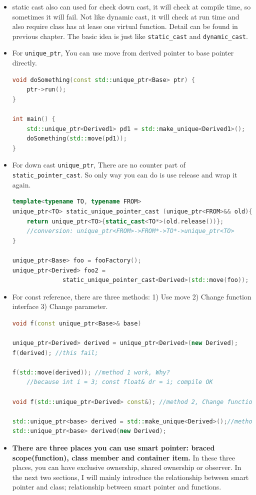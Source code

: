 \documentclass[a4paper,11pt,twoside]{book}
\begin{document}
\begin{itemize}
\item static cast also can used for check down cast, it will check at compile time, so sometimes it will fail. Not like dynamic cast, it will check at run time and also require class has at lease one virtual function. Detail can be found in previous chapter. The basic idea is just like \texttt{static\_cast} and \texttt{dynamic\_cast}.

\item For \texttt{unique\_ptr}, You can use move from derived pointer to base pointer directly.
\begin{lstlisting}[frame=single, language=c++, mathescape=true]
void doSomething(const std::unique_ptr<Base> ptr) {
    ptr->run();
}

int main() {
    std::unique_ptr<Derived1> pd1 = std::make_unique<Derived1>();
    doSomething(std::move(pd1));
}
\end{lstlisting}

\item For down cast \texttt{unique\_ptr}, There are no counter part of \texttt{static\_pointer\_cast}. So only way you can do is use release and wrap it again.

\begin{lstlisting}[frame=single, language=c++, mathescape=true]
template<typename TO, typename FROM>
unique_ptr<TO> static_unique_pointer_cast (unique_ptr<FROM>&& old){
	return unique_ptr<TO>{static_cast<TO*>(old.release())};
	//conversion: unique_ptr<FROM>->FROM*->TO*->unique_ptr<TO>
}

unique_ptr<Base> foo = fooFactory();
unique_ptr<Derived> foo2 = 
              static_unique_pointer_cast<Derived>(std::move(foo));
\end{lstlisting}

\item For const reference, there are three methods: 1) Use move 2) Change function interface 3) Change parameter.
\begin{lstlisting}[frame=single, language=c++, mathescape=true]
void f(const unique_ptr<Base>& base)

unique_ptr<Derived> derived = unique_ptr<Derived>(new Derived);
f(derived); //this fail;

f(std::move(derived)); //method 1 work, Why?
    //because int i = 3; const float& dr = i; compile OK
                       
void f(std::unique_ptr<Derived> const&); //method 2, Change function interface

std::unique_ptr<base> derived = std::make_unique<Derived>();//method 3, Change parameter.
std::unique_ptr<base> derived(new Derived);
\end{lstlisting}


\item \textbf{There are three places you can use smart pointer: braced scope(function), class member and container item.} In these three places, you can have exclusive ownership, shared ownership or observer. In the next two sections, I will mainly introduce the relationship between smart pointer and class; relationship between smart pointer and functions.

\end{itemize}
\end{document}
